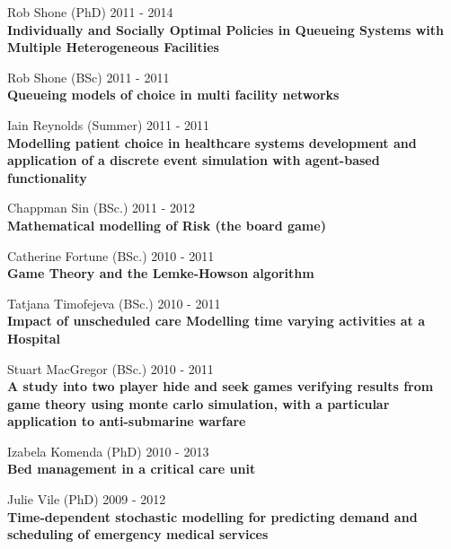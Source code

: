 \documentclass[10pt]{res} %
\begin{document}
\begin{resume}
\begin{etaremune}
\item
    Rob Shone (PhD) \hfill 2011 -
    2014\\
\textbf{Individually and Socially Optimal Policies in Queueing Systems with Multiple Heterogeneous Facilities}\\

\item
    Rob Shone (BSc) \hfill 2011 -
    2011\\
\textbf{Queueing models of choice in multi facility networks}\\

\item
    Iain Reynolds (Summer) \hfill 2011 -
    2011\\
\textbf{Modelling patient choice in healthcare systems development and application of a discrete event simulation with agent-based functionality}\\

\item
    Chappman Sin (BSc.) \hfill 2011 -
    2012\\
\textbf{Mathematical modelling of Risk (the board game)}\\

\item
    Catherine Fortune (BSc.) \hfill 2010 -
    2011\\
\textbf{Game Theory and the Lemke-Howson algorithm}\\

\item
    Tatjana Timofejeva (BSc.) \hfill 2010 -
    2011\\
\textbf{Impact of unscheduled care Modelling time varying activities at a Hospital}\\

\item
    Stuart MacGregor (BSc.) \hfill 2010 -
    2011\\
\textbf{A study into two player hide and seek games verifying results from game theory using monte carlo simulation, with a particular application to anti-submarine warfare}\\

\item
    Izabela Komenda (PhD) \hfill 2010 -
    2013\\
\textbf{Bed management in a critical care unit}\\

\item
    Julie Vile (PhD) \hfill 2009 -
    2012\\
\textbf{Time-dependent stochastic modelling for predicting demand and scheduling of emergency medical services}\\


\end{etaremune}
\end{resume}
\end{document}
